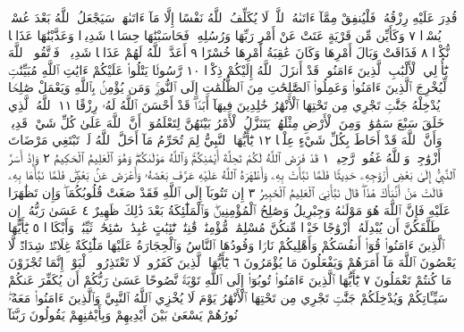 قُدِرَ عَلَيْهِ رِزْقُهُۥ فَلْيُنفِقْ مِمَّآ ءَاتَىٰهُ ٱللَّهُۚ لَا يُكَلِّفُ ٱللَّهُ نَفْسًا إِلَّا
مَآ ءَاتَىٰهَاۚ سَيَجْعَلُ ٱللَّهُ بَعْدَ عُسْرࣲ يُسْرࣰا ٧ وَكَأَيِّن مِّن قَرْيَةٍ عَتَتْ
عَنْ أَمْرِ رَبِّهَا وَرُسُلِهِۦ فَحَاسَبْنَٰهَا حِسَابࣰا شَدِيدࣰا وَعَذَّبْنَٰهَا عَذَابࣰا
نُّكْرࣰا ٨ فَذَاقَتْ وَبَالَ أَمْرِهَا وَكَانَ عَٰقِبَةُ أَمْرِهَا خُسْرًا ٩ أَعَدَّ ٱللَّهُ
لَهُمْ عَذَابࣰا شَدِيدࣰاۖ فَٱتَّقُوا۟ ٱللَّهَ يَٰٓأُو۟لِي ٱلْأَلْبَٰبِ ٱلَّذِينَ ءَامَنُوا۟ۚ قَدْ أَنزَلَ
ٱللَّهُ إِلَيْكُمْ ذِكْرࣰا ١٠ رَّسُولࣰا يَتْلُوا۟ عَلَيْكُمْ ءَايَٰتِ ٱللَّهِ مُبَيِّنَٰتࣲ لِّيُخْرِجَ
ٱلَّذِينَ ءَامَنُوا۟ وَعَمِلُوا۟ ٱلصَّٰلِحَٰتِ مِنَ ٱلظُّلُمَٰتِ إِلَى ٱلنُّورِۚ وَمَن يُؤْمِنۢ
بِٱللَّهِ وَيَعْمَلْ صَٰلِحࣰا يُدْخِلْهُ جَنَّٰتࣲ تَجْرِي مِن تَحْتِهَا ٱلْأَنْهَٰرُ خَٰلِدِينَ
فِيهَآ أَبَدࣰاۖ قَدْ أَحْسَنَ ٱللَّهُ لَهُۥ رِزْقًا ١١ ٱللَّهُ ٱلَّذِي خَلَقَ سَبْعَ سَمَٰوَٰتࣲ
وَمِنَ ٱلْأَرْضِ مِثْلَهُنَّۖ يَتَنَزَّلُ ٱلْأَمْرُ بَيْنَهُنَّ لِتَعْلَمُوٓا۟ أَنَّ ٱللَّهَ عَلَىٰ
كُلِّ شَيْءࣲ قَدِيرࣱ وَأَنَّ ٱللَّهَ قَدْ أَحَاطَ بِكُلِّ شَيْءٍ عِلْمَۢا ١٢
يَٰٓأَيُّهَا ٱلنَّبِيُّ لِمَ تُحَرِّمُ مَآ أَحَلَّ ٱللَّهُ لَكَۖ تَبْتَغِي مَرْضَاتَ أَزْوَٰجِكَۚ وَٱللَّهُ
غَفُورࣱ رَّحِيمࣱ ١ قَدْ فَرَضَ ٱللَّهُ لَكُمْ تَحِلَّةَ أَيْمَٰنِكُمْۚ وَٱللَّهُ مَوْلَىٰكُمْۖ وَهُوَ
ٱلْعَلِيمُ ٱلْحَكِيمُ ٢ وَإِذْ أَسَرَّ ٱلنَّبِيُّ إِلَىٰ بَعْضِ أَزْوَٰجِهِۦ حَدِيثࣰا فَلَمَّا
نَبَّأَتْ بِهِۦ وَأَظْهَرَهُ ٱللَّهُ عَلَيْهِ عَرَّفَ بَعْضَهُۥ وَأَعْرَضَ عَنۢ بَعْضࣲۖ فَلَمَّا
نَبَّأَهَا بِهِۦ قَالَتْ مَنْ أَنۢبَأَكَ هَٰذَاۖ قَالَ نَبَّأَنِيَ ٱلْعَلِيمُ ٱلْخَبِيرُ ٣ إِن
تَتُوبَآ إِلَى ٱللَّهِ فَقَدْ صَغَتْ قُلُوبُكُمَاۖ وَإِن تَظَٰهَرَا عَلَيْهِ فَإِنَّ ٱللَّهَ
هُوَ مَوْلَىٰهُ وَجِبْرِيلُ وَصَٰلِحُ ٱلْمُؤْمِنِينَۖ وَٱلْمَلَٰٓئِكَةُ بَعْدَ ذَٰلِكَ
ظَهِيرٌ ٤ عَسَىٰ رَبُّهُۥٓ إِن طَلَّقَكُنَّ أَن يُبْدِلَهُۥٓ أَزْوَٰجًا خَيْرࣰا مِّنكُنَّ
مُسْلِمَٰتࣲ مُّؤْمِنَٰتࣲ قَٰنِتَٰتࣲ تَٰٓئِبَٰتٍ عَٰبِدَٰتࣲ سَٰٓئِحَٰتࣲ ثَيِّبَٰتࣲ
وَأَبْكَارࣰا ٥ يَٰٓأَيُّهَا ٱلَّذِينَ ءَامَنُوا۟ قُوٓا۟ أَنفُسَكُمْ وَأَهْلِيكُمْ نَارࣰا
وَقُودُهَا ٱلنَّاسُ وَٱلْحِجَارَةُ عَلَيْهَا مَلَٰٓئِكَةٌ غِلَاظࣱ شِدَادࣱ
لَّا يَعْصُونَ ٱللَّهَ مَآ أَمَرَهُمْ وَيَفْعَلُونَ مَا يُؤْمَرُونَ ٦ يَٰٓأَيُّهَا ٱلَّذِينَ
كَفَرُوا۟ لَا تَعْتَذِرُوا۟ ٱلْيَوْمَۖ إِنَّمَا تُجْزَوْنَ مَا كُنتُمْ تَعْمَلُونَ ٧
يَٰٓأَيُّهَا ٱلَّذِينَ ءَامَنُوا۟ تُوبُوٓا۟ إِلَى ٱللَّهِ تَوْبَةࣰ نَّصُوحًا عَسَىٰ رَبُّكُمْ
أَن يُكَفِّرَ عَنكُمْ سَيِّـَٔاتِكُمْ وَيُدْخِلَكُمْ جَنَّٰتࣲ تَجْرِي
مِن تَحْتِهَا ٱلْأَنْهَٰرُ يَوْمَ لَا يُخْزِي ٱللَّهُ ٱلنَّبِيَّ وَٱلَّذِينَ ءَامَنُوا۟
مَعَهُۥۖ نُورُهُمْ يَسْعَىٰ بَيْنَ أَيْدِيهِمْ وَبِأَيْمَٰنِهِمْ يَقُولُونَ رَبَّنَآ

